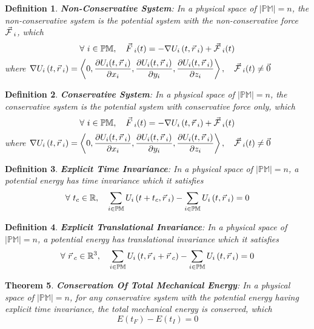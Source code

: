 \documentclass[12pt]{amsart}
\newtheorem{theorem}{Theorem}[section]
\newtheorem{definition}[theorem]{Definition}
\let\oldvec\vec
\renewcommand{\vec}[1]{\oldvec{#1}\hspace{0.1em}}
\begin{document}
\begin{definition}
    \textbf{Non-Conservative System}: In a physical space of $\left | \mathbb{PM} \right | = n$, the non-conservative system is the potential system with the non-conservative force $\vec{\mathcal{F}}_i$, which $$\forall \  i \in \mathbb{PM}, \quad \vec{F}_i (t) = - \nabla U_i \left ( t, \vec{r}_i  \right) + \vec{\mathcal{F}}_i(t) $$ where $ \nabla  U_i \left ( t, \vec{r}_i \right )  = \left < 0, \dfrac{\partial U_i (t, \vec{r}_i)}{\partial x_i}, \dfrac{\partial U_i (t, \vec{r}_i)}{\partial y_i}, \dfrac{\partial U_i (t, \vec{r}_i)}{\partial z_i} \right >, \quad \vec{\mathcal{F}}_i (t) \ne \vec{0} $
\end{definition}

\begin{definition}
    \textbf{Conservative System}: In a physical space of $\left | \mathbb{PM} \right | = n$, the conservative system is the potential system with conservative force only, which $$\forall \  i \in \mathbb{PM}, \quad \vec{F}_i (t) = - \nabla U_i \left ( t, \vec{r}_i  \right) + \vec{\mathcal{F}}_i(t)$$ where $  \nabla  U_i \left ( t, \vec{r}_i \right )  = \left < 0, \dfrac{\partial U_i (t, \vec{r}_i)}{\partial x_i}, \dfrac{\partial U_i (t, \vec{r}_i)}{\partial y_i}, \dfrac{\partial U_i (t, \vec{r}_i)}{\partial z_i} \right >, \quad \vec{\mathcal{F}}_i (t) \ne \vec{0}$
\end{definition}

\begin{definition}
    \textbf{Explicit Time Invariance}: In a physical space of $\left | \mathbb{PM} \right | = n$, a potential energy has time invariance which it satisfies $$\forall \  t_c \in \mathbb{R}, \quad  \sum_{i \in \mathbb{PM}}   U_i \left ( t+t_c, \vec{r}_i \right ) - \sum_{i \in \mathbb{PM}}   U_i \left ( t, \vec{r}_i \right )  = 0 $$
\end{definition}

\begin{definition}
    \textbf{Explicit Translational Invariance}: In a physical space of $\left | \mathbb{PM} \right | = n$, a potential energy has translational invariance which it satisfies $$\forall \  \vec{r}_c \in \mathbb{R}^3, \quad  \sum_{i \in \mathbb{PM}}   U_i \left ( t, \vec{r}_i + \vec{r}_c \right ) - \sum_{i \in \mathbb{PM}}   U_i \left ( t, \vec{r}_i \right ) = 0 $$
\end{definition}

\begin{theorem}
    \textbf{Conservation Of Total Mechanical Energy}: In a physical space of $\left | \mathbb{PM} \right | = n$, for any conservative system with the potential energy having explicit time invariance, the total mechanical energy is conserved, which $$ E(t_F) -  E(t_I) = 0 $$
\end{theorem}
\end{document}
